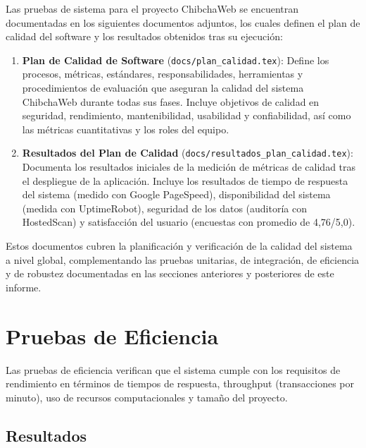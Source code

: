 \documentclass[12pt,a4paper]{article}
\begin{document}
Las pruebas de sistema para el proyecto ChibchaWeb se encuentran documentadas en los
siguientes documentos adjuntos, los cuales definen el plan de calidad del software y los
resultados obtenidos tras su ejecución:

\begin{enumerate}
  \item \textbf{Plan de Calidad de Software}
        (\texttt{docs/plan\_calidad.tex}): Define los procesos, métricas, estándares,
        responsabilidades, herramientas y procedimientos de evaluación que aseguran la
        calidad del sistema ChibchaWeb durante todas sus fases. Incluye objetivos de
        calidad en seguridad, rendimiento, mantenibilidad, usabilidad y confiabilidad,
        así como las métricas cuantitativas y los roles del equipo.

  \item \textbf{Resultados del Plan de Calidad}
        (\texttt{docs/resultados\_plan\_calidad.tex}): Documenta los resultados iniciales
        de la medición de métricas de calidad tras el despliegue de la aplicación. Incluye
        los resultados de tiempo de respuesta del sistema (medido con Google PageSpeed),
        disponibilidad del sistema (medida con UptimeRobot), seguridad de los datos
        (auditoría con HostedScan) y satisfacción del usuario (encuestas con promedio
        de 4,76/5,0).
\end{enumerate}

Estos documentos cubren la planificación y verificación de la calidad del sistema a nivel
global, complementando las pruebas unitarias, de integración, de eficiencia y de robustez
documentadas en las secciones anteriores y posteriores de este informe.

\newpage
\section{Pruebas de Eficiencia}

Las pruebas de eficiencia verifican que el sistema cumple con los requisitos de rendimiento
en términos de tiempos de respuesta, throughput (transacciones por minuto), uso de recursos
computacionales y tamaño del proyecto.

\subsection{Resultados}
\end{document}
